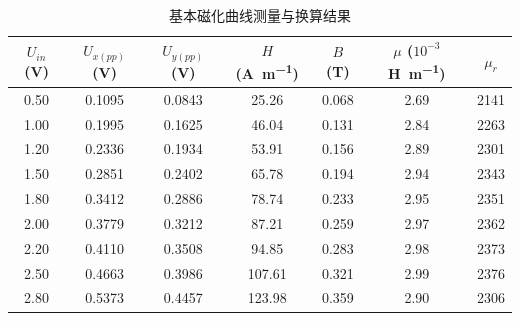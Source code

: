 \documentclass{../template/Report}%
\begin{document}
\begin{fullreportonly}
    \begin{table}[H]
        \centering
        \caption{基本磁化曲线测量与换算结果}
        \label{tab:basic_curve}
        \begin{tabular}{ccccccc} %
            \toprule
            $U_{in}$ (\unit{\volt}) & $U_{x(pp)}$ (\unit{\volt}) & $U_{y(pp)}$ (\unit{\volt}) & $H$ (\unit{\ampere\per\meter}) & $B$ (\unit{\tesla}) & $\mu$ ($10^{-3}$\unit{\henry\per\meter}) & $\mu_r$ \\
            \midrule
            0.50                    & 0.1095                     & 0.0843                     & 25.26                          & 0.068               & 2.69                                     & 2141    \\
            1.00                    & 0.1995                     & 0.1625                     & 46.04                          & 0.131               & 2.84                                     & 2263    \\
            1.20                    & 0.2336                     & 0.1934                     & 53.91                          & 0.156               & 2.89                                     & 2301    \\
            1.50                    & 0.2851                     & 0.2402                     & 65.78                          & 0.194               & 2.94                                     & 2343    \\
            1.80                    & 0.3412                     & 0.2886                     & 78.74                          & 0.233               & 2.95                                     & 2351    \\
            2.00                    & 0.3779                     & 0.3212                     & 87.21                          & 0.259               & 2.97                                     & 2362    \\
            2.20                    & 0.4110                     & 0.3508                     & 94.85                          & 0.283               & 2.98                                     & 2373    \\
            2.50                    & 0.4663                     & 0.3986                     & 107.61                         & 0.321               & 2.99                                     & 2376    \\
            2.80                    & 0.5373                     & 0.4457                     & 123.98                         & 0.359               & 2.90                                     & 2306    \\

\end{tabular}
\end{table}
\end{fullreportonly}
\end{document}
